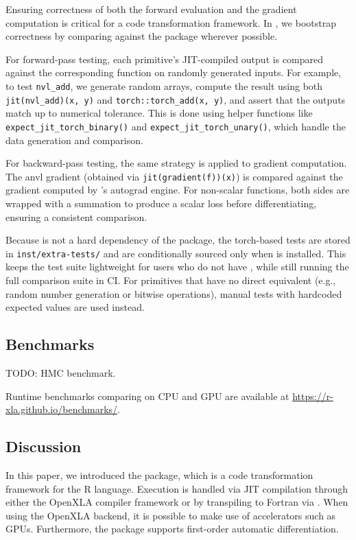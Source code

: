 Ensuring correctness of both the forward evaluation and the gradient computation is critical for a code transformation framework.
In , we bootstrap correctness by comparing against the  package wherever possible.

For forward-pass testing, each primitive's JIT-compiled output is compared against the corresponding  function on randomly generated inputs.
For example, to test \texttt{nvl\_add}, we generate random arrays, compute the result using both \texttt{jit(nvl\_add)(x,\ y)} and \texttt{torch::torch\_add(x,\ y)}, and assert that the outputs match up to numerical tolerance.
This is done using helper functions like \texttt{expect\_jit\_torch\_binary()} and \texttt{expect\_jit\_torch\_unary()}, which handle the data generation and comparison.

For backward-pass testing, the same strategy is applied to gradient computation.
The anvl gradient (obtained via \texttt{jit(gradient(f))(x)}) is compared against the gradient computed by 's autograd engine.
For non-scalar functions, both sides are wrapped with a summation to produce a scalar loss before differentiating, ensuring a consistent comparison.

Because  is not a hard dependency of the package, the torch-based tests are stored in \texttt{inst/extra-tests/} and are conditionally sourced only when  is installed.
This keeps the test suite lightweight for users who do not have , while still running the full comparison suite in CI.
For primitives that have no direct  equivalent (e.g., random number generation or bitwise operations), manual tests with hardcoded expected values are used instead.

\subsection{Benchmarks}\label{benchmarks}

TODO: HMC benchmark.

Runtime benchmarks comparing  on CPU and GPU are available at \url{https://r-xla.github.io/benchmarks/}.

\subsection{Discussion}\label{discussion}

In this paper, we introduced the  package, which is a code transformation framework for the R language.
Execution is handled via JIT compilation through either the OpenXLA compiler framework or by transpiling to Fortran via .
When using the OpenXLA backend, it is possible to make use of accelerators such as GPUs.
Furthermore, the package supports first-order automatic differentiation.

